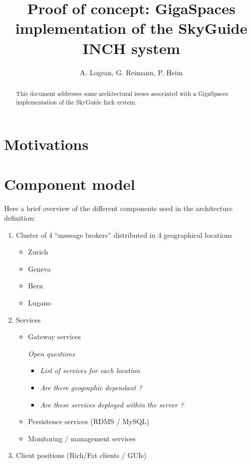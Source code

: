 \documentclass[a4paper,20pt,notitlepage]{article}
\title{Proof of concept: GigaSpaces implementation of the SkyGuide INCH system}
\author{A. Logean, G. Reimann, P. Heim}
\begin{document}
\maketitle

\begin{abstract}
This document addresses some architectural issues associated with a GigaSpaces implementation of the SkyGuide Inch system. 
\end{abstract}

\section{Motivations}
\section{Component model}

Here a brief overview of the different components used in the architecture definition:

\begin{enumerate}
 \item Cluster of 4 “message brokers”  distributed in 4 geographical locations
\begin{itemize}
 \item Zurich
 \item Geneva
 \item Bern
 \item Lugano
\end{itemize}
 \item Services
\begin{itemize}
\item Gateway services

\textit{Open questions}
\begin{itemize}
\item \textit{List of services for each location} 
\item \textit{Are there geographic dependant ?}
\item \textit{Are these services deployed within the server ?}
\end{itemize}

\item Persistence services (RDMS / MySQL)

\item Monitoring / management services
\end{itemize}

\item Client positions (Rich/Fat clients / GUIs)
\end{enumerate}
\end{document}
